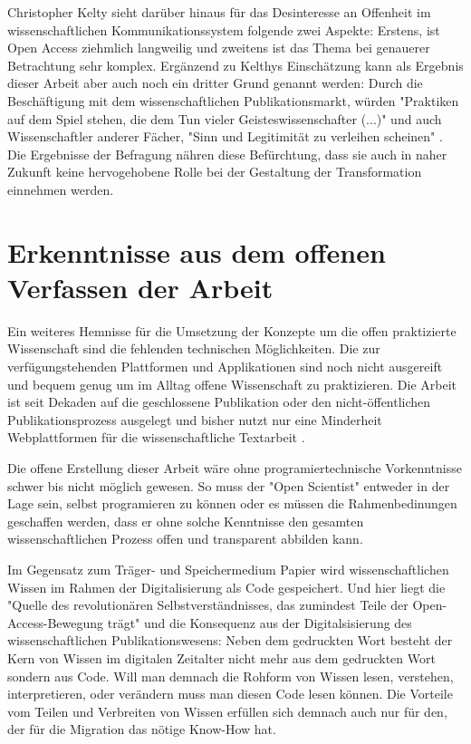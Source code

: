 Christopher Kelty sieht darüber hinaus für das Desinteresse an Offenheit im wissenschaftlichen Kommunikationssystem folgende zwei Aspekte: Erstens, ist Open Access ziehmlich langweilig und zweitens ist das Thema bei genauerer Betrachtung sehr komplex. Ergänzend zu Kelthys Einschätzung kann als Ergebnis dieser Arbeit aber auch noch ein dritter Grund genannt werden: Durch die Beschäftigung mit dem wissenschaftlichen Publikationsmarkt, würden "Praktiken auf dem Spiel stehen, die dem Tun vieler Geisteswissenschafter (...)" und auch Wissenschaftler anderer Fächer, "Sinn und Legitimität zu verleihen scheinen" \cite{Hirschi_2015_buch_oa}. Die Ergebnisse der Befragung nähren diese Befürchtung, dass sie auch in naher Zukunft keine hervogehobene Rolle bei der Gestaltung der Transformation einnehmen werden.

\section{Erkenntnisse aus dem offenen Verfassen der Arbeit}

Ein weiteres Hemnisse für die Umsetzung der Konzepte um die offen praktizierte Wissenschaft sind die fehlenden technischen Möglichkeiten. Die zur verfügungstehenden Plattformen und Applikationen sind noch nicht ausgereift und bequem genug um im Alltag offene Wissenschaft zu praktizieren. Die Arbeit ist seit Dekaden auf die geschlossene Publikation oder den nicht-öffentlichen Publikationsprozess ausgelegt und bisher nutzt nur eine Minderheit Webplattformen für die wissenschaftliche Textarbeit \cite{Perkel_2014}.

Die offene Erstellung dieser Arbeit wäre ohne programiertechnische Vorkenntnisse schwer bis nicht möglich gewesen. So muss der "Open Scientist" entweder in der Lage sein, selbst programieren zu können oder es müssen die Rahmenbedinungen geschaffen werden, dass er ohne solche Kenntnisse den gesamten wissenschaftlichen Prozess offen und transparent abbilden kann.

Im Gegensatz zum Träger- und Speichermedium Papier wird wissenschaftlichen Wissen im Rahmen der Digitalisierung als Code gespeichert. Und hier liegt die "Quelle des revolutionären Selbstverständnisses, das zumindest Teile der Open-Access-Bewegung trägt" und die Konsequenz aus der Digitalsisierung des wissenschaftlichen Publikationswesens: Neben dem gedruckten Wort besteht der Kern von Wissen im digitalen Zeitalter nicht mehr aus dem gedruckten Wort sondern aus Code. Will man demnach die Rohform von Wissen lesen, verstehen, interpretieren, oder verändern muss man diesen Code lesen können. Die Vorteile vom Teilen und Verbreiten von Wissen erfüllen sich demnach auch nur für den, der für die Migration das nötige Know-How hat.

